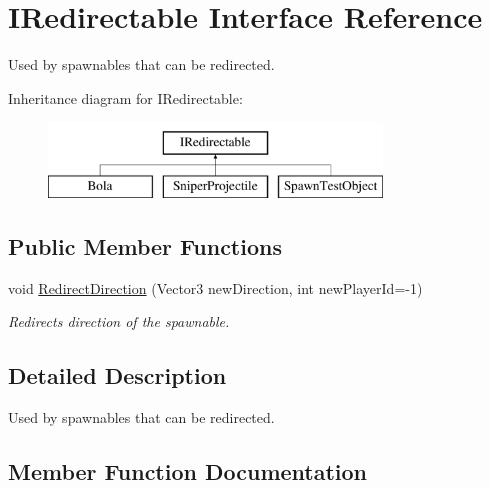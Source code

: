 \hypertarget{interface_i_redirectable}{}\section{I\+Redirectable Interface Reference}
\label{interface_i_redirectable}


Used by spawnables that can be redirected.  


Inheritance diagram for I\+Redirectable\+:\begin{figure}[H]
\begin{center}
\leavevmode
\includegraphics[height=2.000000cm]{interface_i_redirectable}
\end{center}
\end{figure}
\subsection*{Public Member Functions}
\begin{DoxyCompactItemize}
\item 
void \hyperlink{interface_i_redirectable_aa15f51457871f82028b3789ff0b0e33c}{Redirect\+Direction} (Vector3 new\+Direction, int new\+Player\+Id=-\/1)
\begin{DoxyCompactList}\small\item\em Redirects direction of the spawnable. \end{DoxyCompactList}\end{DoxyCompactItemize}


\subsection{Detailed Description}
Used by spawnables that can be redirected. 



\subsection{Member Function Documentation}
\hypertarget{interface_i_redirectable_aa15f51457871f82028b3789ff0b0e33c}{}\label{interface_i_redirectable_aa15f51457871f82028b3789ff0b0e33c} 
